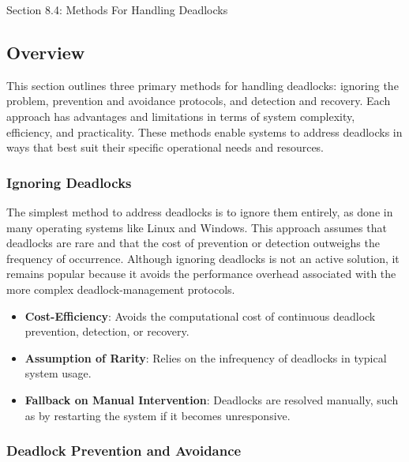 \begin{notes}{Section 8.4: Methods For Handling Deadlocks}
    \subsection*{Overview}

    This section outlines three primary methods for handling deadlocks: ignoring the problem, prevention and avoidance protocols, and detection and recovery. Each approach has advantages and limitations 
    in terms of system complexity, efficiency, and practicality. These methods enable systems to address deadlocks in ways that best suit their specific operational needs and resources.
    
    \subsubsection*{Ignoring Deadlocks}
    
    The simplest method to address deadlocks is to ignore them entirely, as done in many operating systems like Linux and Windows. This approach assumes that deadlocks are rare and that the cost of 
    prevention or detection outweighs the frequency of occurrence. Although ignoring deadlocks is not an active solution, it remains popular because it avoids the performance overhead associated with 
    the more complex deadlock-management protocols.
    
    \begin{highlight}
    
        \begin{itemize}
            \item \textbf{Cost-Efficiency}: Avoids the computational cost of continuous deadlock prevention, detection, or recovery.
            \item \textbf{Assumption of Rarity}: Relies on the infrequency of deadlocks in typical system usage.
            \item \textbf{Fallback on Manual Intervention}: Deadlocks are resolved manually, such as by restarting the system if it becomes unresponsive.
        \end{itemize}
    
    \end{highlight}
    
    \subsubsection*{Deadlock Prevention and Avoidance}
    

\end{notes}
